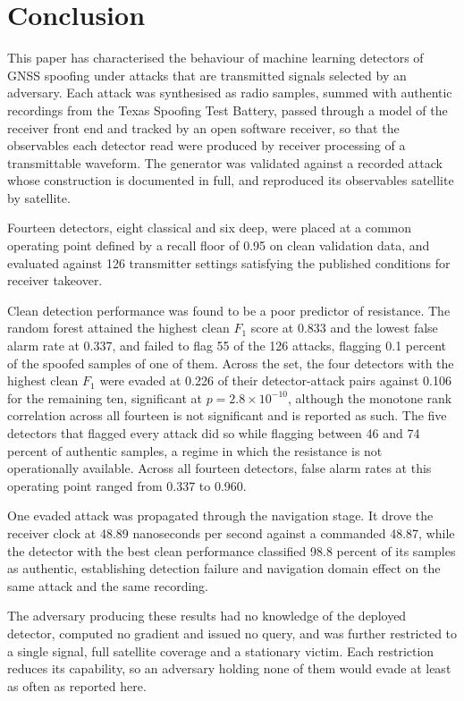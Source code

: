 \documentclass[pdflatex,sn-basic]{sn-jnl}
\theoremstyle{thmstyleone}
\theoremstyle{thmstyletwo}
\theoremstyle{thmstylethree}
\begin{document}
\section{Conclusion}
\label{sec:conclusion}

This paper has characterised the behaviour of machine learning detectors of GNSS spoofing
under attacks that are transmitted signals selected by an adversary. Each attack was
synthesised as radio samples, summed with authentic recordings from the Texas Spoofing Test
Battery, passed through a model of the receiver front end and tracked by an open software
receiver, so that the observables each detector read were produced by receiver processing
of a transmittable waveform. The generator was validated against a recorded attack whose
construction is documented in full, and reproduced its observables satellite by satellite.

Fourteen detectors, eight classical and six deep, were placed at a common operating point
defined by a recall floor of 0.95 on clean validation data, and evaluated against 126
transmitter settings satisfying the published conditions for receiver takeover.

Clean detection performance was found to be a poor predictor of resistance. The random
forest attained the highest clean $F_1$ score at 0.833 and the lowest false alarm rate at
0.337, and failed to flag 55 of the 126 attacks, flagging 0.1 percent of the spoofed
samples of one of them. Across the set, the four detectors with the highest clean $F_1$
were evaded at 0.226 of their detector-attack pairs against 0.106 for the remaining ten,
significant at $p = 2.8 \times 10^{-10}$, although the monotone rank correlation across all
fourteen is not significant and is reported as such. The
five detectors that flagged every attack did so while flagging between 46 and 74 percent of
authentic samples, a regime in which the resistance is not operationally available. Across
all fourteen detectors, false alarm rates at this operating point ranged from 0.337 to
0.960.

One evaded attack was propagated through the navigation stage. It drove the receiver clock
at 48.89 nanoseconds per second against a commanded 48.87, while the detector with the best
clean performance classified 98.8 percent of its samples as authentic, establishing
detection failure and navigation domain effect on the same attack and the same recording.

The adversary producing these results had no knowledge of the deployed detector, computed
no gradient and issued no query, and was further restricted to a single signal, full
satellite coverage and a stationary victim. Each restriction reduces its capability, so an
adversary holding none of them would evade at least as often as reported here.
\end{document}
